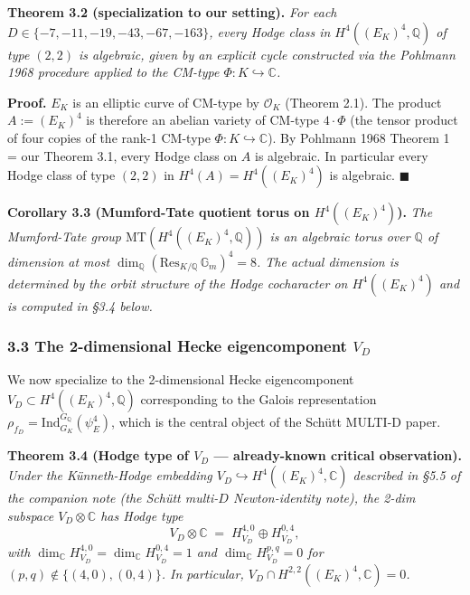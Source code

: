 \documentclass[
  11pt,
  a4paper,
]{article}
\begin{document}
\textbf{Theorem 3.2 (specialization to our setting).} \emph{For each \(D \in \{-7, -11, -19, -43, -67, -163\}\), every Hodge class in \(H^4((E_K)^4, \mathbb{Q})\) of type \((2, 2)\) is algebraic, given by an explicit cycle constructed via the Pohlmann 1968 procedure applied to the CM-type \(\Phi : K \hookrightarrow \mathbb{C}\).}

\textbf{Proof.} \(E_K\) is an elliptic curve of CM-type by \(\mathcal{O}_K\) (Theorem 2.1). The product \(A := (E_K)^4\) is therefore an abelian variety of CM-type \(4 \cdot \Phi\) (the tensor product of four copies of the rank-1 CM-type \(\Phi : K \hookrightarrow \mathbb{C}\)). By Pohlmann 1968 Theorem 1 = our Theorem 3.1, every Hodge class on \(A\) is algebraic. In particular every Hodge class of type \((2, 2)\) in \(H^4(A) = H^4((E_K)^4)\) is algebraic. \(\blacksquare\)

\textbf{Corollary 3.3 (Mumford-Tate quotient torus on \(H^4((E_K)^4)\)).} \emph{The Mumford-Tate group \(\mathrm{MT}(H^4((E_K)^4, \mathbb{Q}))\) is an algebraic torus over \(\mathbb{Q}\) of dimension at most \(\dim_\mathbb{Q} (\mathrm{Res}_{K/\mathbb{Q}}\,\mathbb{G}_m)^4 = 8\). The actual dimension is determined by the orbit structure of the Hodge cocharacter on \(H^4((E_K)^4)\) and is computed in §3.4 below.}

\hypertarget{the-2-dimensional-hecke-eigencomponent-v_d}{%
\subsubsection{\texorpdfstring{3.3 The 2-dimensional Hecke eigencomponent \(V_D\)}{3.3 The 2-dimensional Hecke eigencomponent V\_D}}\label{the-2-dimensional-hecke-eigencomponent-v_d}}

We now specialize to the 2-dimensional Hecke eigencomponent \(V_D \subset H^4((E_K)^4, \mathbb{Q})\) corresponding to the Galois representation \(\rho_{f_D} = \mathrm{Ind}_{G_K}^{G_\mathbb{Q}}(\psi_E^4)\), which is the central object of the Schütt MULTI-D paper.

\textbf{Theorem 3.4 (Hodge type of \(V_D\) --- already-known critical observation).} \emph{Under the Künneth-Hodge embedding \(V_D \hookrightarrow H^4((E_K)^4, \mathbb{C})\) described in §5.5 of the companion note (the Schütt multi-$D$ Newton-identity note), the 2-dim subspace \(V_D \otimes \mathbb{C}\) has Hodge type}
\[
V_D \otimes \mathbb{C} \;=\; H^{4, 0}_{V_D} \oplus H^{0, 4}_{V_D},
\]
\emph{with \(\dim_\mathbb{C} H^{4, 0}_{V_D} = \dim_\mathbb{C} H^{0, 4}_{V_D} = 1\) and \(\dim_\mathbb{C} H^{p, q}_{V_D} = 0\) for \((p, q) \notin \{(4, 0), (0, 4)\}\). In particular, \(V_D \cap H^{2, 2}((E_K)^4, \mathbb{C}) = 0\).}
\end{document}
